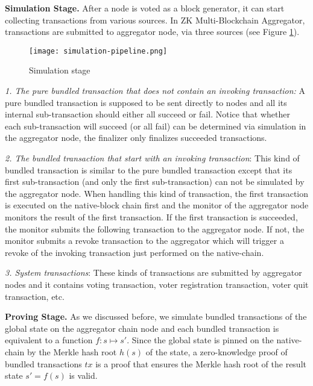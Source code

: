 \smallskip\noindent\textbf{Simulation Stage.}
After a node is voted as a block generator, it can start collecting transactions from various sources. In ZK Multi-Blockchain Aggregator, transactions are submitted to aggregator node, via three sources (see Figure \ref{simulation-stage}).

\begin{figure}[!ht]
\begin{center}
\texttt{[image: simulation-pipeline.png]}
\end{center}
\caption{Simulation stage}
\label{simulation-stage}
\end{figure}

\noindent\textit{1. The pure bundled transaction that does not contain an invoking transaction:} A pure bundled transaction is supposed to be sent directly to \dprotocol nodes and all its internal sub-transaction should either all succeed or fail. Notice that whether each sub-transaction will succeed (or all fail) can be determined via simulation in the aggregator node, the finalizer only finalizes succeeded transactions.

\noindent\textit{2. The bundled transaction that start with an invoking transaction}: This kind of bundled transaction is similar to the pure bundled transaction except that its first sub-transaction (and only the first sub-transaction) can not be simulated by the aggregator node. When handling this kind of transaction, the first transaction is executed on the native-block chain first and the monitor of the aggregator node monitors the result of the first transaction. If the first transaction is succeeded, the monitor submits the following transaction to the aggregator node. If not, the monitor submits a revoke transaction to the aggregator which will trigger a revoke of the invoking transaction just performed on the native-chain.

\noindent\textit{3. System transactions}: These kinds of transactions are submitted by aggregator nodes and it contains voting transaction, voter registration transaction, voter quit transaction, etc.

\smallskip\noindent\textbf{Proving Stage.}
As we discussed before, we simulate bundled transactions of the global state on the aggregator chain node and each bundled transaction is equivalent to a function $f: s \mapsto s'$. Since the global state is pinned on the native-chain by the Merkle hash root $h(s)$ of the state, a zero-knowledge proof of bundled transactions $tx$ is a proof that ensures the Merkle hash root of the result state $s' = f(s)$ is valid. 

